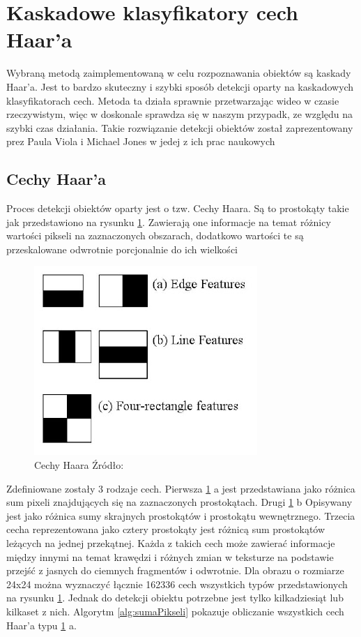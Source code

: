 \section{Kaskadowe klasyfikatory cech Haar'a}

Wybraną metodą zaimplementowaną w celu rozpoznawania obiektów są kaskady Haar'a. Jest to bardzo skuteczny i szybki sposób detekcji oparty na kaskadowych klasyfikatorach cech. Metoda ta działa sprawnie przetwarzając wideo w czasie rzeczywistym, więc w doskonale sprawdza się w naszym przypadk, ze względu na szybki czas działania. Takie rozwiązanie detekcji obiektów został zaprezentowany prez Paula Viola i Michael Jones w jedej z ich prac naukowych \cite{violaJones}

\subsection{Cechy Haar'a}
Proces detekcji obiektów oparty jest o tzw. Cechy Haara. Są to prostokąty takie jak przedstawiono na rysunku \ref{fig:cechyHaara}. Zawierają one informacje na temat różnicy wartości pikseli na zaznaczonych obszarach, dodatkowo wartości te są przeskalowane odwrotnie porcjonalnie do ich wielkości
\begin{figure}[H]
\centering
\includegraphics[scale=0.5]{imgs/cechy.jpg}
\caption{{Cechy Haara Źródło:} \cite{faceDetectionOpenCV}}
\label{fig:cechyHaara}
\end{figure}

Zdefiniowane zostały 3 rodzaje cech. Pierwsza \ref{fig:cechyHaara} a jest przedstawiana jako różnica sum pixeli znajdujących się na zaznaczonych prostokątach. Drugi \ref{fig:cechyHaara} b  Opisywany jest jako różnica sumy skrajnych prostokątów i prostokątu wewnętrznego. Trzecia cecha reprezentowana jako cztery prostokąty jest różnicą sum prostokątów leżących na jednej przekątnej. Każda z takich cech może zawierać informacje między innymi na temat krawędzi i różnych zmian w teksturze na podstawie przejść z jasnych do ciemnych fragmentów i odwrotnie. Dla obrazu o rozmiarze 24x24 można wyznaczyć łącznie 162336 cech wszystkich typów przedstawionych na rysunku \ref{fig:cechyHaara}. Jednak do detekcji obiektu potrzebne jest tylko kilkadziesiąt lub kilkaset z nich. Algorytm \ref{alg:sumaPikseli} pokazuje obliczanie wszystkich cech Haar'a typu \ref{fig:cechyHaara} a.

